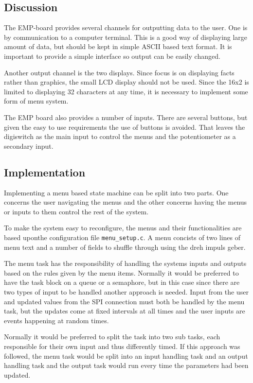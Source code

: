 \subsection{Discussion}
The EMP-board provides several channels for outputting data to the user. One is
by communication to a computer terminal. This is a good way of displaying large
amount of data, but should be kept in simple ASCII based text format. It is
important to provide a simple interface so output can be easily changed.

Another output channel is the two displays. Since focus is on displaying facts
rather than graphics, the small LCD display should not be used. Since the 16x2
is limited to displaying 32 characters at any time, it is necessary to implement
some form of menu system.
 
The EMP board also provides a number of inputs. There are several buttons, but
given the easy to use requirements the use of buttons is avoided. That leaves
the digiswitch as the main input to control the menus and the potentiometer as a
secondary input.



\subsection{Implementation}
Implementing a menu based state machine can be split into two parts. One
concerns the user navigating the menus and the other concerns having the menus or inputs to them
control the rest of the system. 

To make the system easy to reconfigure, the menus and their functionalities are based uponthe configuration file \texttt{menu\_setup.c}. A menu concists of two lines of menu text and a number of fields to shuffle through using the dreh impuls geber. 

The menu task has the responsibility of handling the systems inputs and outputs based on the rules given by the menu items. Normally it would be preferred to have the task block on a queue or a semaphore, but in this case since there are two types of input to be handled another approach is needed.  Input from the user and updated values from the SPI connection must both be handled by the menu task, but the updates come at fixed intervals at all times and the user inputs are events happening at random times.

Normally it would be preferred to split the task into two sub tasks, each responsible for their own input and thus differently timed. If this approach was followed, the menu task would be split into an input handling task and an output handling task and the output task would run every time the parameters had been updated. 

